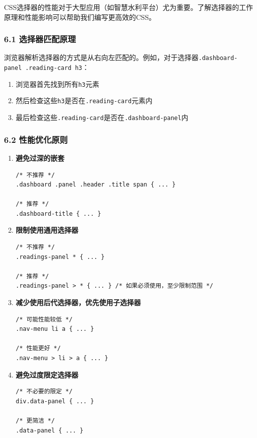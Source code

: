 CSS选择器的性能对于大型应用（如智慧水利平台）尤为重要。了解选择器的工作原理和性能影响可以帮助我们编写更高效的CSS。

\subsubsection{6.1
选择器匹配原理}\label{ux9009ux62e9ux5668ux5339ux914dux539fux7406}

浏览器解析选择器的方式是从右向左匹配的。例如，对于选择器\passthrough{\lstinline!.dashboard-panel .reading-card h3!}：

\begin{enumerate}
\def\labelenumi{\arabic{enumi}.}
\tightlist
\item
  浏览器首先找到所有\passthrough{\lstinline!h3!}元素
\item
  然后检查这些\passthrough{\lstinline!h3!}是否在\passthrough{\lstinline!.reading-card!}元素内
\item
  最后检查这些\passthrough{\lstinline!.reading-card!}是否在\passthrough{\lstinline!.dashboard-panel!}内
\end{enumerate}

\subsubsection{6.2
性能优化原则}\label{ux6027ux80fdux4f18ux5316ux539fux5219}

\begin{enumerate}
\def\labelenumi{\arabic{enumi}.}
\item
  \textbf{避免过深的嵌套}

\begin{lstlisting}
/* 不推荐 */
.dashboard .panel .header .title span { ... }

/* 推荐 */
.dashboard-title { ... }
\end{lstlisting}
\item
  \textbf{限制使用通用选择器}

\begin{lstlisting}
/* 不推荐 */
.readings-panel * { ... }

/* 推荐 */
.readings-panel > * { ... } /* 如果必须使用，至少限制范围 */
\end{lstlisting}
\item
  \textbf{减少使用后代选择器，优先使用子选择器}

\begin{lstlisting}
/* 可能性能较低 */
.nav-menu li a { ... }

/* 性能更好 */
.nav-menu > li > a { ... }
\end{lstlisting}
\item
  \textbf{避免过度限定选择器}

\begin{lstlisting}
/* 不必要的限定 */
div.data-panel { ... }

/* 更简洁 */
.data-panel { ... }
\end{lstlisting}
\end{enumerate}

